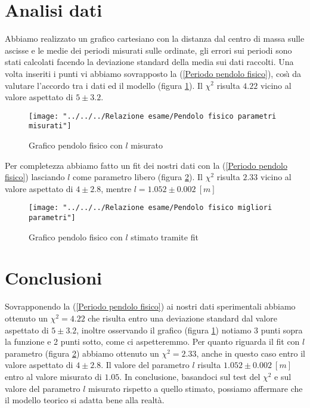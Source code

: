 \documentclass{article}
\begin{document}
		\section{Analisi dati}
			Abbiamo realizzato un grafico cartesiano con la distanza dal centro di massa sulle ascisse e le medie dei periodi misurati sulle ordinate, gli errori sui periodi sono stati calcolati facendo la deviazione standard della media sui dati raccolti. Una volta inseriti i punti vi abbiamo sovrapposto la (\ref{Periodo pendolo fisico}), cos\`{\i} da valutare l'accordo tra i dati ed il modello (figura \ref{fig:pendolo-fisico-parametri-misurati}). Il $\chi^2$ risulta $4.22$ vicino al valore aspettato di $5\pm3.2$.
			\begin{figure}
				\centering
				\texttt{[image: "../../../Relazione esame/Pendolo fisico parametri misurati"]}
				\caption{Grafico pendolo fisico con $l$ misurato}
				\label{fig:pendolo-fisico-parametri-misurati}
			\end{figure}
			Per completezza abbiamo fatto un fit dei nostri dati con la (\ref{Periodo pendolo fisico}) lasciando $l$ come parametro libero (figura \ref{fig:pendolo-fisico-migliori-parametri}). Il $\chi^2$ risulta $2.33$ vicino al valore aspettato di $4\pm2.8$, mentre $l = 1.052\pm0.002\:[m]$
			\begin{figure}
				\centering
				\texttt{[image: "../../../Relazione esame/Pendolo fisico migliori parametri"]}
				\caption{Grafico pendolo fisico con $l$ stimato tramite fit}
				\label{fig:pendolo-fisico-migliori-parametri}
			\end{figure}
		
		\section{Conclusioni}
			Sovrapponendo la (\ref{Periodo pendolo fisico}) ai nostri dati sperimentali abbiamo ottenuto un $\chi^2 = 4.22$ che risulta entro una deviazione standard dal valore aspettato di $5\pm3.2$, inoltre osservando il grafico (figura \ref{fig:pendolo-fisico-parametri-misurati}) notiamo 3 punti sopra la funzione e 2 punti sotto, come ci aspetteremmo.
			Per quanto riguarda il fit con $l$ parametro (figura \ref{fig:pendolo-fisico-migliori-parametri}) abbiamo ottenuto un $\chi^2 = 2.33$, anche in questo caso entro il valore aspettato di $4\pm2.8$. Il valore del parametro $l$ risulta $1.052\pm0.002\:[m]$ entro al valore misurato di $1.05$. In conclusione, basandoci sul test del $\chi^2$ e sul valore del parametro $l$ misurato rispetto a quello stimato, possiamo affermare che il modello teorico si adatta bene alla realt\`{a}.
\end{document}
